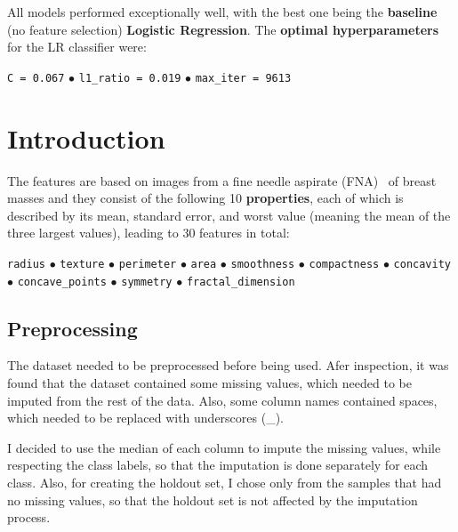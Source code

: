 \documentclass[12pt]{article}
\begin{document}
All models performed exceptionally well, with the best one being the
\textbf{baseline} (no feature selection) \textbf{Logistic Regression}. The
\textbf{optimal hyperparameters} for the LR classifier were:
\begin{center}
    \texttt{C = 0.067}
    $\bullet$ 
    \texttt{l1\_ratio = 0.019}
    $\bullet$ 
    \texttt{max\_iter = 9613}
\end{center}



\section{Introduction}

The features are based on images from a fine needle aspirate (FNA)~\cite{Yu2012}
of breast masses and they consist of the following 10 \textbf{properties}, each
of which is described by its mean, standard error, and worst value (meaning the
mean of the three largest values), leading to 30 features in total:
\begin{center}
    \texttt{radius}
    $\bullet$ 
    \texttt{texture}
    $\bullet$ 
    \texttt{perimeter}
    $\bullet$ 
    \texttt{area}
    $\bullet$ 
    \texttt{smoothness}
    $\bullet$ 
    \texttt{compactness}
    $\bullet$ 
    \texttt{concavity}
    $\bullet$ 
    \texttt{concave\_points}
    $\bullet$ 
    \texttt{symmetry}
    $\bullet$ 
    \texttt{fractal\_dimension}    
\end{center}


\subsection{Preprocessing}

The dataset needed to be preprocessed before being used. Afer inspection, it was
found that the dataset contained some missing values, which needed to be
imputed from the rest of the data. Also, some column names contained spaces,
which needed to be replaced with underscores (\_).

I decided to use the median of each column to impute the missing values, while
respecting the class labels, so that the imputation is done separately for each
class. Also, for creating the holdout set, I chose only from the samples that
had no missing values, so that the holdout set is not affected by the imputation
process.
\end{document}
